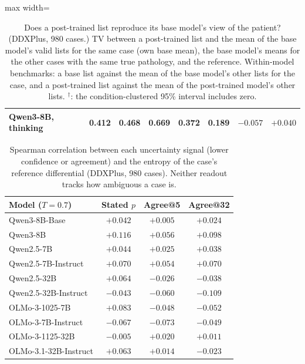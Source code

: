 \documentclass[11pt]{article}
\begin{document}
\begin{table}[t]
\begin{adjustbox}{max width=\linewidth}
\begin{tabular}{lccccccc}
Qwen3-8B, thinking & 0.412 & 0.468 & 0.669 & 0.372 & 0.189 & $-0.057$ & $+0.040$ \\
\bottomrule
\end{tabular}
\end{adjustbox}
\caption{Does a post-trained list reproduce its base model's view of the patient? (DDXPlus, 980 cases.) TV between a post-trained list and the mean of the base model's valid lists for the same case (own base mean), the base model's means for the other cases with the same true pathology, and the reference. Within-model benchmarks: a base list against the mean of the base model's other lists for the case, and a post-trained list against the mean of the post-trained model's other lists. $^{\dagger}$: the condition-clustered 95\% interval includes zero.}
\label{tab:packing}
\end{table}

\begin{table}[t]
\centering\small
\begin{tabular}{lccc}
\toprule
Model ($T{=}0.7$) & Stated $p$ & Agree@5 & Agree@32 \\
\midrule
Qwen3-8B-Base & $+0.042$ & $+0.005$ & $+0.024$ \\
Qwen3-8B & $+0.116$ & $+0.056$ & $+0.098$ \\
Qwen2.5-7B & $+0.044$ & $+0.025$ & $+0.038$ \\
Qwen2.5-7B-Instruct & $+0.070$ & $+0.054$ & $+0.070$ \\
Qwen2.5-32B & $+0.064$ & $-0.026$ & $-0.038$ \\
Qwen2.5-32B-Instruct & $-0.043$ & $-0.060$ & $-0.109$ \\
OLMo-3-1025-7B & $+0.083$ & $-0.048$ & $-0.052$ \\
OLMo-3-7B-Instruct & $-0.067$ & $-0.073$ & $-0.049$ \\
OLMo-3-1125-32B & $-0.005$ & $+0.020$ & $+0.011$ \\
OLMo-3.1-32B-Instruct & $+0.063$ & $+0.014$ & $-0.023$ \\
\bottomrule
\end{tabular}
\caption{Spearman correlation between each uncertainty signal (lower confidence or agreement) and the entropy of the case's reference differential (DDXPlus, 980 cases). Neither readout tracks how ambiguous a case is.}
\label{tab:ambiguity}
\end{table}
\end{document}
